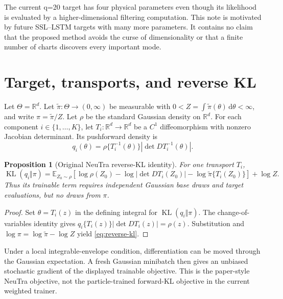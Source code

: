 \documentclass[11pt]{article}
\newtheorem{proposition}[theorem]{Proposition}
\theoremstyle{definition}
\theoremstyle{remark}
\newcommand{\R}{\mathbb{R}}
\newcommand{\E}{\mathbb{E}}
\newcommand{\KL}{\operatorname{KL}}
\newcommand{\1}{\mathbf{1}}
\newcommand{\dd}{\,\mathrm{d}}
\newcommand{\abs}[1]{\left|#1\right|}
\begin{document}
The current q=20 target has four physical parameters even though its likelihood
is evaluated by a higher-dimensional filtering computation.  This note is
motivated by future SSL--LSTM targets with many more parameters.  It contains
no claim that the proposed method avoids the curse of dimensionality or that a
finite number of charts discovers every important mode.

\section{Target, transports, and reverse KL}

Let $\Theta=\R^d$.  Let $\widetilde\pi:\Theta\to(0,\infty)$ be measurable with
$0<Z=\int\widetilde\pi(\theta)\dd\theta<\infty$, and write
$\pi=\widetilde\pi/Z$.  Let $\rho$ be the standard Gaussian density on
$\R^d$.  For each component $i\in\{1,\ldots,K\}$, let
$T_i:\R^d\to\R^d$ be a $C^1$ diffeomorphism with nonzero Jacobian determinant.
Its pushforward density is
\begin{equation}
 q_i(\theta)
 =\rho\{T_i^{-1}(\theta)\}
  \abs{\det D T_i^{-1}(\theta)}.
 \label{eq:component-density}
\end{equation}

\begin{proposition}[Original NeuTra reverse-KL identity]
\label{prop:reverse-kl}
For one transport $T_i$,
\begin{equation}
 \KL(q_i\Vert\pi)
 =\E_{Z_0\sim\rho}\!\left[
   \log\rho(Z_0)-\log\abs{\det DT_i(Z_0)}
   -\log\widetilde\pi\{T_i(Z_0)\}
 \right]+\log Z.
 \label{eq:reverse-kl}
\end{equation}
Thus its trainable term requires independent Gaussian base draws and target
evaluations, but no draws from $\pi$.
\end{proposition}

\begin{proof}
Set $\theta=T_i(z)$ in the defining integral for
$\KL(q_i\Vert\pi)$.  The change-of-variables identity gives
$q_i\{T_i(z)\}\abs{\det DT_i(z)}=\rho(z)$.  Substitution and
$\log\pi=\log\widetilde\pi-\log Z$ yield
\eqref{eq:reverse-kl}.
\end{proof}

Under a local integrable-envelope condition, differentiation can be moved
through the Gaussian expectation.  A fresh Gaussian minibatch then gives an
unbiased stochastic gradient of the displayed trainable objective.  This is
the paper-style NeuTra objective, not the particle-trained forward-KL
objective in the current weighted trainer.
\end{document}
